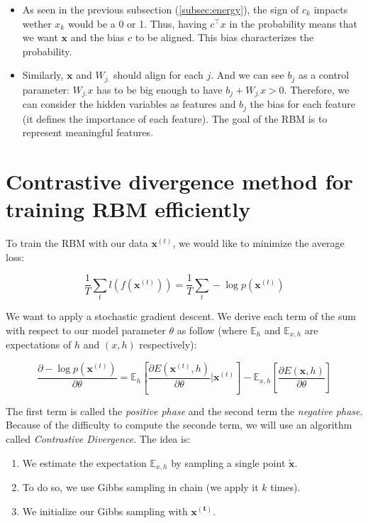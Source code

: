 \documentclass{article}
\begin{document}
\begin{itemize}
    \item As seen in the previous subsection (\ref{subsec:energy}), the sign of $c_k$ impacts wether $x_k$ would be a 0 or 1. Thus, having $c^\top x$ in the probability means that we want $\mathbf{x}$ and the bias $c$ to be aligned. This bias characterizes the probability.
    \item Similarly, $\mathbf{x}$ and $W_{j.}$ should align for each $j$. And we can see $b_j$ as a control parameter: $W_{j.}x$ has to be big enough to have $b_j + W_{j.}x > 0 $.  Therefore, we can consider the hidden variables as features and $b_j$ the bias for each feature (it defines the importance of each feature). The goal of the RBM is to represent meaningful features.
\end{itemize}


\section{Contrastive divergence method for training RBM efficiently}

To train the RBM with our data $\mathbf{x}^{(t)}$, we would like to minimize the average loss:

\[ \frac{1}{T} \sum_t l(f(\mathbf{x}^{(t)})) =  \frac{1}{T} \sum_t - \log p(\mathbf{x}^{(t)}) \]

We want to apply a stochastic gradient descent. We derive each term of the sum with respect to our model parameter $\theta$ as follow (where $\mathbb{E}_h$ and $\mathbb{E}_{x,h}$ are expectations of $h$ and $(x,h)$ respectively):

\[ \frac{\partial - \log p(\mathbf{x}^{(t)})}{\partial \theta} = \mathbb{E}_h \left[ \frac{\partial E(\mathbf{x}^{(t)} ,h)}{\partial \theta} | \mathbf{x}^{(t)} \right] - \mathbb{E}_{x,h} \left[ \frac{\partial E(\mathbf{x} ,h)}{\partial \theta} \right] \]

The first term is called the \emph{positive phase} and the second term the \emph{negative phase}. Because of the difficulty to compute the seconde term, we will use an algorithm called \emph{Contrastive Divergence}. The idea is:

\begin{enumerate}
    \item We estimate the expectation $\mathbb{E}_{x,h}$ by sampling a single point $\mathbf{\tilde x}$.
    \item To do so, we use Gibbs sampling in chain (we apply it $k$ times).
    \item We initialize our Gibbs sampling with $\mathbf{x^{(t)}}$.
\end{enumerate}
\end{document}
